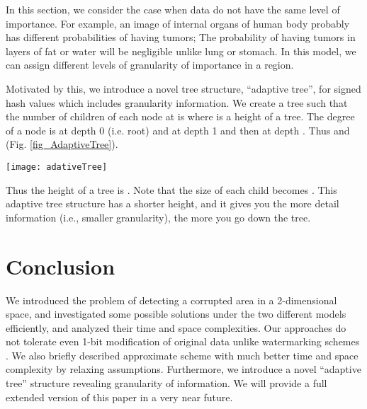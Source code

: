 \documentclass{llncs}
\begin{document}
In this section, we consider the case when data do not have the same level of importance.
For example, an image of internal organs of human body probably has 
different probabilities of having tumors; 
The probability of having tumors in layers of fat or water will be negligible
unlike lung or stomach.  
In this model, we can assign different levels of granularity of importance in a region.

Motivated by this, we introduce a novel tree structure, ``adaptive tree'', 
for signed hash values which includes granularity information.
We create a tree such that the number of children of each node at  is  
where  is a height of a tree.
The degree of a node is  at depth 0 (i.e. root) and  at depth 1 and then 
 at depth . Thus  and 
 (Fig. \ref{fig_AdaptiveTree}).

\begin{figure*}[htp]
\centering
{\texttt{[image: adativeTree]}}
\caption{Adaptive Tree (e.g.,)}
\label{fig_AdaptiveTree}
\end{figure*}

Thus the height of a tree  is .
Note that the size of each child becomes . 
This adaptive tree structure has a shorter height, 
and it gives you the more detail information (i.e., smaller granularity),
the more you go down the tree.


\section{Conclusion}
\label{Conclusion}

We introduced the problem of detecting a corrupted area in a 2-dimensional space,
and investigated some possible solutions under the two different models efficiently, 
and analyzed their time and space complexities.
Our approaches do not tolerate even 1-bit modification of original data unlike watermarking schemes \cite{ZaMu07}.
We also briefly described approximate scheme with much better time and space complexity by relaxing assumptions.
Furthermore, we introduce a novel ``adaptive tree'' structure revealing granularity of information.
We will provide a full extended version of this paper in a very near future.



\end{document}
